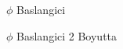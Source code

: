 \documentclass[12pt,fleqn]{article}\usepackage{../common}
\begin{document}
\begin{figure}[!hbp]
\caption{$\phi$ Baslangici}
\end{figure}


\begin{figure}[!hbp]
\caption{$\phi$ Baslangici 2 Boyutta}
\end{figure}
\end{document}
